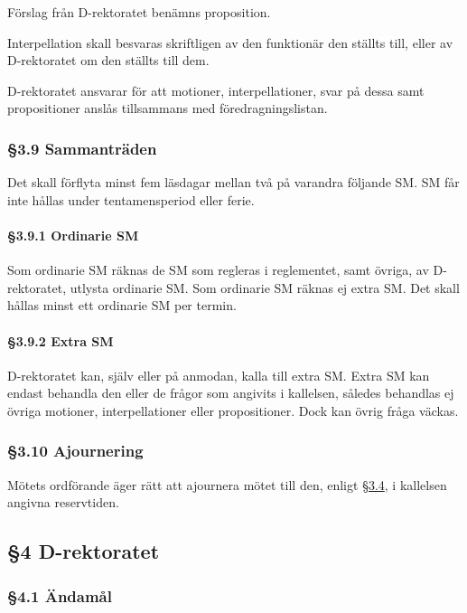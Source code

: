 Förslag från D-rektoratet benämns proposition.

Interpellation skall besvaras skriftligen av den funktionär den ställts till, eller av D-rektoratet om den ställts till dem.

D-rektoratet ansvarar för att motioner, interpellationer, svar på dessa samt propositioner anslås tillsammans med föredragningslistan.

\subsubsection{§3.9 Sammanträden}

Det skall förflyta minst fem läsdagar mellan två på varandra följande SM. SM får inte hållas under tentamensperiod eller ferie.

\paragraph{§3.9.1 Ordinarie SM}

Som ordinarie SM räknas de SM som regleras i reglementet, samt övriga, av D-rektoratet, utlysta ordinarie SM. Som ordinarie SM räknas ej extra SM. Det skall hållas minst ett ordinarie SM per termin.

\paragraph{§3.9.2 Extra SM}

D-rektoratet kan, själv eller på anmodan, kalla till extra SM. Extra SM kan endast behandla den eller de frågor som angivits i kallelsen, således behandlas ej övriga motioner, interpellationer eller propositioner. Dock kan övrig fråga väckas.

\subsubsection{§3.10 Ajournering}

Mötets ordförande äger rätt att ajournera mötet till den, enligt \href{#kallelse}{§3.4}, i kallelsen angivna reservtiden.

\subsection{§4 D-rektoratet}

\subsubsection{§4.1 Ändamål}

